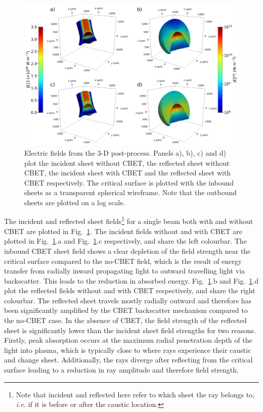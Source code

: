 \begin{figure}[t!]
    \includegraphics[width=1.0\linewidth]{Numerics/Images/IFRIIT_test_fields.png}
    \centering
    \caption{Electric fields from the 3-D post-process.
    Panels a), b), c) and d) plot the incident sheet without \ac{CBET}, the reflected sheet without \ac{CBET}, the incident sheet with \ac{CBET} and the reflected sheet with \ac{CBET} respectively.
    The critical surface is plotted with the inbound sheets as a transparent spherical wireframe.
    Note that the outbound sheets are plotted on a log scale.}%
    \label{fig:SOLAS_IFRIIT_test_fields}
\end{figure}

The incident and reflected sheet fields\footnote{Note that incident and reflected here refer to which sheet the ray belongs to, \textit{i.e.} if it is before or after the caustic location.} for a single beam both with and without \ac{CBET} are plotted in Fig.~\ref{fig:SOLAS_IFRIIT_test_fields}.
The incident fields without and with \ac{CBET} are plotted in Fig.~\ref{fig:SOLAS_IFRIIT_test_fields}.a and Fig.~\ref{fig:SOLAS_IFRIIT_test_fields}.c respectively, and share the left colourbar.
The inbound \ac{CBET} sheet field shows a clear depletion of the field strength near the critical surface compared to the no-\ac{CBET} field, which is the result of energy transfer from radially inward propagating light to outward travelling light via backscatter.
This leads to the reduction in absorbed energy.
Fig.~\ref{fig:SOLAS_IFRIIT_test_fields}.b and Fig.~\ref{fig:SOLAS_IFRIIT_test_fields}.d plot the reflected fields without and with \ac{CBET} respectively, and share the right colourbar.
The reflected sheet travels mostly radially outward and therefore has been significantly amplified by the \ac{CBET} backscatter mechanism compared to the no-\ac{CBET} case.
In the absence of \ac{CBET}, the field strength of the reflected sheet is significantly lower than the incident sheet field strengths for two reasons.
Firstly, peak absorption occurs at the maximum radial penetration depth of the light into plasma, which is typically close to where rays experience their caustic and change sheet.
Additionally, the rays diverge after reflecting from the critical surface leading to a reduction in ray amplitude and therefore field strength.


